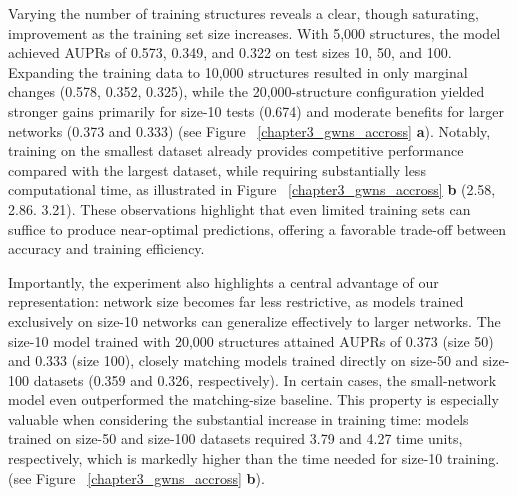 Varying the number of training structures reveals a clear, though saturating, improvement as the training set size increases. With 5,000 structures, the model achieved AUPRs of 0.573, 0.349, and 0.322 on test sizes 10, 50, and 100. Expanding the training data to 10,000 structures resulted in only marginal changes (0.578, 0.352, 0.325), while the 20,000-structure configuration yielded stronger gains primarily for size-10 tests (0.674) and moderate benefits for larger networks (0.373 and 0.333) (see Figure ~\ref{chapter3_gwns_accross} \textbf{a}). Notably, training on the smallest dataset already provides competitive performance compared with the largest dataset, while requiring substantially less computational time, as illustrated in Figure ~\ref{chapter3_gwns_accross} \textbf{b} (2.58, 2.86. 3.21). These observations highlight that even limited training sets can suffice to produce near-optimal predictions, offering a favorable trade-off between accuracy and training efficiency.

Importantly, the experiment also highlights a central advantage of our representation: network size becomes far less restrictive, as models trained exclusively on size-10 networks can generalize effectively to larger networks. The size-10 model trained with 20,000 structures attained AUPRs of 0.373 (size 50) and 0.333 (size 100), closely matching models trained directly on size-50 and size-100 datasets (0.359 and 0.326, respectively). In certain cases, the small-network model even outperformed the matching-size baseline. This property is especially valuable when considering the substantial increase in training time: models trained on size-50 and size-100 datasets required 3.79 and 4.27 time units, respectively, which is markedly higher than the time needed for size-10 training. (see Figure ~\ref{chapter3_gwns_accross} \textbf{b}).

